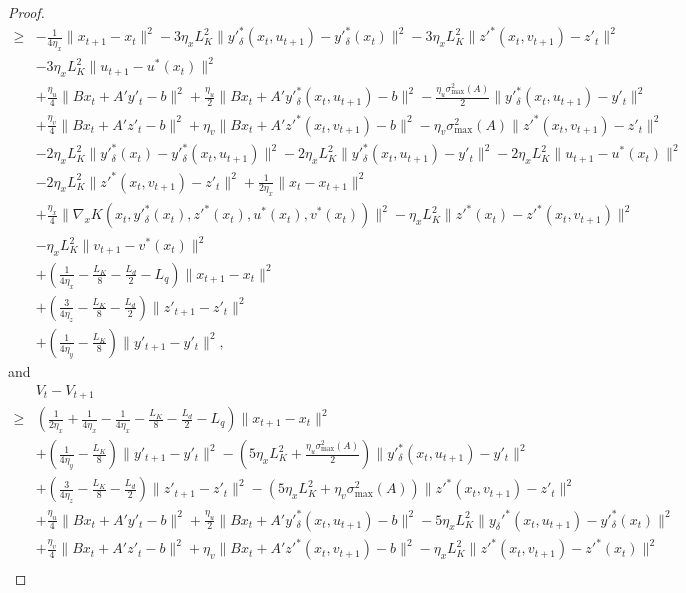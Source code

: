 \documentclass{article}
\newcommand{\pth}[1]{\left( #1 \right)}
\theoremstyle{plain}
\theoremstyle{definition}
\theoremstyle{remark}
\begin{document}
\begin{proof}
\begin{align*}
    \geq&-\frac{1}{4\eta_x}\|x_{t+1}-x_t\|^2-3\eta_xL_K^2\|y'^*_\delta(x_t,u_{t+1})-y'^*_\delta(x_t)\|^2-3\eta_xL_K^2\|z'^*(x_t,v_{t+1})-z'_t\|^2\\
    &-3\eta_xL_K^2\|u_{t+1}-u^*(x_t)\|^2\\
    &+\frac{\eta_u}{4}\|Bx_t+A'y'_t-b\|^2+\frac{\eta_u}{2}\|Bx_t+A'y'^*_\delta(x_t,u_{t+1})-b\|^2-\frac{\eta_u \sigma_{\max}^2(A)}{2}\|y'^*_\delta(x_t,u_{t+1})-y'_t\|^2\\
    &+\frac{\eta_v}{4}\|Bx_t+A'z'_t-b\|^2+\eta_v\|Bx_t+A'z'^*(x_{t},v_{t+1})-b\|^2-\eta_v \sigma_{\max}^2(A) \|z'^*(x_t,v_{t+1})-z'_t\|^2\\
    &-2\eta_xL_K^2\|y'^*_\delta(x_t)-y'^*_\delta(x_t,u_{t+1})\|^2-2\eta_xL_K^2\|y'^*_\delta(x_t,u_{t+1})-y'_t\|^2-2\eta_xL_K^2\|u_{t+1}-u^*(x_t)\|^2\\
    &-2\eta_xL_K^2\|z'^*(x_t, v_{t+1})-z'_t\|^2+\frac{1}{2\eta_x}\|x_t-x_{t+1}\|^2\\
    &+\frac{\eta_x}{4}\|\nabla_x K(x_t, y'^*_\delta(x_t), z'^*(x_t), u^*(x_t), v^*(x_t))\|^2-\eta_xL_K^2\|z'^*(x_t)-z'^*(x_t, v_{t+1})\|^2\\
    &-\eta_xL_K^2\|v_{t+1}-v^*(x_t)\|^2\\
    &+\pth{\frac{1}{4\eta_x}-\frac{L_K}{8}-\frac{L_d}{2}-L_q}\|x_{t+1}-x_t\|^2\\
    &+\pth{\frac{3}{4\eta_z}-\frac{L_K}{8}-\frac{L_d}{2}}\|z'_{t+1}-z'_t\|^2\\
    &+\pth{\frac{1}{4\eta_y}-\frac{L_K}{8}}\|y'_{t+1}-y'_t\|^2,
\end{align*}
and
\begin{align*}
    &V_t-V_{t+1}\\
    \geq&\pth{\frac{1}{2\eta_x}+\frac{1}{4\eta_x}-\frac{1}{4\eta_x}-\frac{L_K}{8}-\frac{L_d}{2}-L_q}\|x_{t+1}-x_t\|^2\\
    &+\pth{\frac{1}{4\eta_y}-\frac{L_K}{8}}\|y'_{t+1}-y'_t\|^2-\pth{5\eta_xL_K^2+\frac{\eta_u \sigma_{\max}^2(A)}{2}}\|y'^*_\delta(x_t,u_{t+1})-y'_t\|^2\\
    &+\pth{\frac{3}{4\eta_z}-\frac{L_K}{8}-\frac{L_d}{2}}\|z'_{t+1}-z'_t\|^2-\pth{5\eta_xL_K^2+\eta_v \sigma_{\max}^2(A)}\|z'^*(x_t,v_{t+1})-z'_t\|^2\\
    &+\frac{\eta_u}{4}\|Bx_t+A'y'_t-b\|^2+\frac{\eta_u}{2}\|Bx_t+A'y'^*_\delta(x_t,u_{t+1})-b\|^2-5\eta_xL_K^2\|y_\delta'^*(x_t,u_{t+1})-y'^*_\delta(x_t)\|^2\\
    &+\frac{\eta_v}{4}\|Bx_t+A'z'_t-b\|^2+\eta_v\|Bx_t+A'z'^*(x_t,v_{t+1})-b\|^2-\eta_xL_K^2\|z'^*(x_t, v_{t+1})-z'^*(x_t)\|^2\\

\end{align*}
\end{proof}
\end{document}
